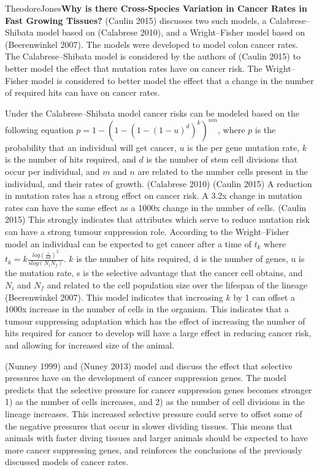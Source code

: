 \documentclass[12pt,letterpaper]{article}
\begin{document}
\begin{mla}{Theodore}{Jones}{}{}{}{\textbf{Why is there Cross-Species Variation in Cancer Rates in Fast Growing Tissues?}}
(Caulin 2015) discusses two such models, a Calabrese–Shibata model based on (Calabrese 2010), and a Wright–Fisher model based on (Beerenwinkel 2007). The models were developed to model colon cancer rates. The Calabrese–Shibata model is considered by the authors of (Caulin 2015) to better model the effect that mutation rates have on cancer risk. The Wright–Fisher model is considered to better model the effect that a change in the number of required hits can have on cancer rates. 

Under the Calabrese–Shibata model cancer risks can be modeled based on the following equation $p = 1 - (1 - (1 - (1 - u)^d )^k )^{nm}$, where $p$ is the probability that an individual will get cancer, $u$ is the per gene mutation rate, $k$ is the number of hits required, and $d$ is the number of stem cell divisions that occur per individual, and $m$ and $n$ are related to the number cells present in the individual, and their rates of growth. (Calabrese 2010) (Caulin 2015) A reduction in mutation rates has a strong effect on cancer risk. A 3.2x change in mutation rates can have the same effect as a 1000x change in the number of cells. (Caulin 2015) This strongly indicates that attributes which serve to reduce mutation risk can have a strong tumour suppression role. According to the Wright–Fisher model an individual can be expected to get cancer after a time of $t_k$ where $t_k = k \frac{log(\frac{s}{ud})^2}{s log(N_i N_f) }$. $k$ is the number of hits required, d is the number of genes, u is the mutation rate, s is the selective advantage that the cancer cell obtains, and $N_i$ and $N_f$ and related to the cell population size over the lifespan of the lineage (Beerenwinkel 2007). This model indicates that increasing $k$ by 1 can offset a 1000x increase in the number of cells in the organism. This indicates that a tumour suppressing adaptation which has the effect of increasing the number of hits required for cancer to develop will have a large effect in reducing cancer risk, and allowing for increased size of the animal. 

(Nunney 1999) and (Nuney 2013) model and discuss the effect that selective pressures have on the development of cancer suppression genes. The model predicts that the selective pressure for cancer suppression genes becomes stronger 1) as the number of cells increases, and 2) as the number of cell divisions in the lineage increases. This increased selective pressure could serve to offset some of the negative pressures that occur in slower dividing tissues. This means that animals with faster diving tissues and larger animals should be expected to have more cancer suppressing genes, and reinforces the conclusions of the previously discussed models of cancer rates. 


\end{mla}
\end{document}
